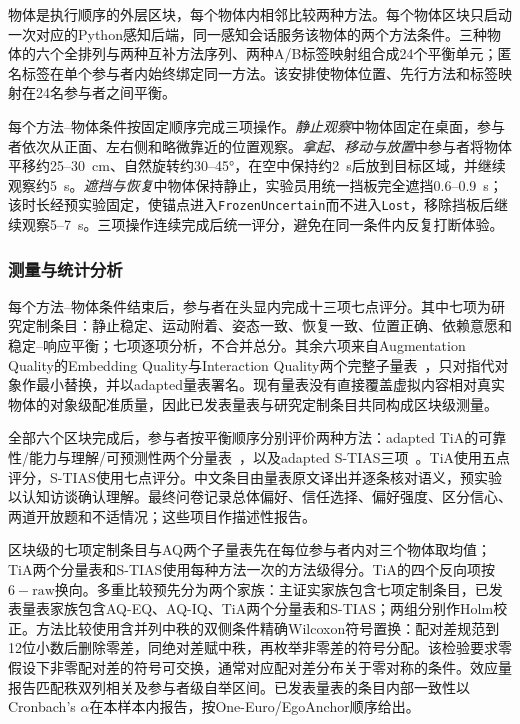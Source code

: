 \documentclass[review]{vgtc}
\begin{document}
物体是执行顺序的外层区块，每个物体内相邻比较两种方法。每个物体区块只启动一次对应的Python感知后端，同一感知会话服务该物体的两个方法条件。三种物体的六个全排列与两种互补方法序列、两种A/B标签映射组合成24个平衡单元；匿名标签在单个参与者内始终绑定同一方法。该安排使物体位置、先行方法和标签映射在24名参与者之间平衡。

每个方法--物体条件按固定顺序完成三项操作。\emph{静止观察}中物体固定在桌面，参与者依次从正面、左右侧和略微靠近的位置观察。\emph{拿起、移动与放置}中参与者将物体平移约25--30~cm、自然旋转约30--45°，在空中保持约2~s后放到目标区域，并继续观察约5~s。\emph{遮挡与恢复}中物体保持静止，实验员用统一挡板完全遮挡0.6--0.9~s；该时长经预实验固定，使锚点进入\texttt{FrozenUncertain}而不进入\texttt{Lost}，移除挡板后继续观察5--7~s。三项操作连续完成后统一评分，避免在同一条件内反复打断体验。

\subsubsection{测量与统计分析}

每个方法--物体条件结束后，参与者在头显内完成十三项七点评分。其中七项为研究定制条目：静止稳定、运动附着、姿态一致、恢复一致、位置正确、依赖意愿和稳定--响应平衡；七项逐项分析，不合并总分。其余六项来自Augmentation Quality的Embedding Quality与Interaction Quality两个完整子量表~\cite{schein2025aq}，只对指代对象作最小替换，并以adapted量表署名。现有量表没有直接覆盖虚拟内容相对真实物体的对象级配准质量，因此已发表量表与研究定制条目共同构成区块级测量。

全部六个区块完成后，参与者按平衡顺序分别评价两种方法：adapted TiA的可靠性/能力与理解/可预测性两个分量表~\cite{koerber2019tia}，以及adapted S-TIAS三项~\cite{mcgrath2025stias}。TiA使用五点评分，S-TIAS使用七点评分。中文条目由量表原文译出并逐条核对语义，预实验以认知访谈确认理解。最终问卷记录总体偏好、信任选择、偏好强度、区分信心、两道开放题和不适情况；这些项目作描述性报告。

区块级的七项定制条目与AQ两个子量表先在每位参与者内对三个物体取均值；TiA两个分量表和S-TIAS使用每种方法一次的方法级得分。TiA的四个反向项按$6-\mathrm{raw}$换向。多重比较预先分为两个家族：主证实家族包含七项定制条目，已发表量表家族包含AQ-EQ、AQ-IQ、TiA两个分量表和S-TIAS；两组分别作Holm校正。方法比较使用含并列中秩的双侧条件精确Wilcoxon符号置换：配对差规范到12位小数后删除零差，同绝对差赋中秩，再枚举非零差的符号分配。该检验要求零假设下非零配对差的符号可交换，通常对应配对差分布关于零对称的条件。效应量报告匹配秩双列相关及参与者级自举区间。已发表量表的条目内部一致性以Cronbach's $\alpha$在本样本内报告，按One-Euro/EgoAnchor顺序给出。
\end{document}
